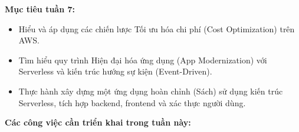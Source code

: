 \vspace{0.5em}\noindent\textbf{Mục tiêu tuần 7:}\par

\begin{itemize}
\tightlist
\item
  Hiểu và áp dụng các chiến lược Tối ưu hóa chi phí (Cost Optimization)
  trên AWS.
\item
  Tìm hiểu quy trình Hiện đại hóa ứng dụng (App Modernization) với
  Serverless và kiến trúc hướng sự kiện (Event-Driven).
\item
  Thực hành xây dựng một ứng dụng hoàn chỉnh (Sách) sử dụng kiến trúc
  Serverless, tích hợp backend, frontend và xác thực người dùng.
\end{itemize}

\vspace{0.5em}\noindent\textbf{Các công việc cần triển khai trong tuần
này:}\par

